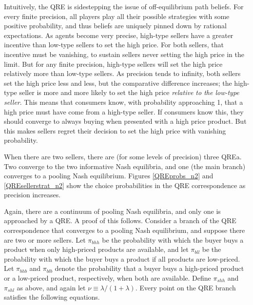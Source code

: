 \documentclass[12pt]{article}
\begin{document}
Intuitively, the QRE is sidestepping the issue of off-equilibrium path beliefs. For every finite precision, all players play all their possible strategies with some positive probability, and thus beliefs are uniquely pinned down by rational expectations. As agents become very precise, high-type sellers have a greater incentive than low-type sellers to set the high price. For both sellers, that incentive must be vanishing, to sustain sellers never setting the high price in the limit. But for any finite precision, high-type sellers will set the high price relatively more than low-type sellers. As precision tends to infinity, both sellers set the high price less and less, but the comparative difference increases; the high-type seller is more and more likely to set the high price \emph{relative to the low-type seller}. This means that consumers know, with probability approaching 1, that a high price must have come from a high-type seller. If consumers know this, they should converge to always buying when presented with a high price product. But this makes sellers regret their decision to set the high price with vanishing probability.

When there are two sellers, there are (for some levels of precision) three QREa. Two converge to the two informative Nash equilibria, and one (the main branch) converges to a pooling Nash equilibrium. Figures \ref{QREprobs_n2} and \ref{QREsellerstrat_n2} show the choice probabilities in the QRE correspondence as precision increases.





Again, there are a continuum of pooling Nash equilibria, and only one is approached by a QRE. A proof of this follows. Consider a branch of the QRE correspondence that converges to a pooling Nash equilibrium, and suppose there are two or more sellers. Let $\pi_{bhh}$ be the probability with which the buyer buys a product when only high-priced products are available, and let $\pi_{bll}$ be the probability with which the buyer buys a product if all products are low-priced. Let $\pi_{bhb}$ and $\pi_{blb}$ denote the probability that a buyer buys a high-priced product or a low-priced product, respectively, when both are available. Define $\pi_{shh}$ and $\pi_{shl}$ as above, and again let $\nu \equiv \lambda / (1 + \lambda)$. Every point on the QRE branch satisfies the following equations.
\end{document}
